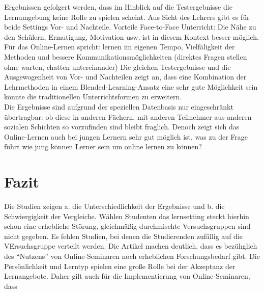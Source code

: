 Ergebnissen gefolgert werden, dass im Hinblick auf die Testergebnisse
die Lernumgebung keine Rolle zu spielen scheint. Aus Sicht des Lehrers
gibt es für beide Settings Vor- und Nachteile. Vorteile Face-to-Face
Unterricht: Die Nähe zu den Schülern, Ermutigung, Motivation usw. ist in
diesem Kontext besser möglich. Für das Online-Lernen spricht: lernen im
eigenen Tempo, Vielfäligkeit der Methoden und bessere
Kommunikationsmöglichkeiten (direktes Fragen stellen ohne warten,
chatten untereinander) Die gleichen Testergebnisse und die
Ausgewogenheit von Vor- und Nachteilen zeigt an, dass eine Kombination
der Lehrmethoden in einem Blended-Learning-Ansatz eine sehr gute
Möglichkeit sein könnte die traditionellen Unterrichtsformen zu
erweitern.\\Die Ergebnisse sind aufgrund der speziellen Datenbasis nur
eingeschränkt übertragbar: ob diese in anderen Fächern, mit anderen
Teilnehmer aus anderen sozialen Schichten so vorzufinden sind bleibt
fraglich. Denoch zeigt sich das Online-Lernen auch bei jungen Lernern
sehr gut möglich ist, was zu der Frage führt wie jung können Lerner sein
um online lernen zu können?

\section{Fazit}\label{fazit}

Die Studien zeigen a. die Unterschiedlichkeit der Ergebnisse und b. die
Schwiergigkeit der Vergleiche. Wählen Studenten das lernsetting steckt
hierhin schon eine erhebliche Störung, gleichmäßig durchmischte
Versuchsgruppen sind nicht gegeben. Es fehlen Studien, bei denen die
Studierenden zufällig auf die VErsuchsgruppe verteilt werden. Die
Artikel machen deutlich, dass es bezühglich des ``Nutzens'' von
Online-Seminaren noch erheblichen Forschungsbedarf gibt. Die
Persönlichkeit und Lerntyp spielen eine große Rolle bei der Akzeptanz
der Lernangebote. Daher gilt auch für die Implementierung von
Online-Seminaren, dass
